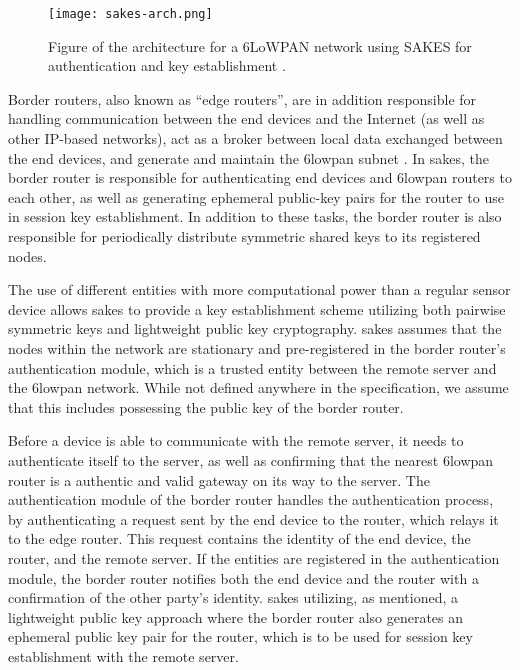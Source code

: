 \begin{figure}[h]
	\centering
	\texttt{[image: sakes-arch.png]}
	\caption{Figure of the architecture for a 6LoWPAN network using SAKES for authentication and key establishment \cite{hussen2013sakes}.}
	\label{fig:sakes-arch}
\end{figure}


Border routers, also known as ``edge routers'', are in addition responsible for handling communication between the end devices and the Internet (as well as other IP-based networks), act as a broker between local data exchanged between the end devices, and generate and maintain the \gls{6lowpan} subnet \cite{olsson20146lowpan}. In \gls{sakes}, the border router is responsible for authenticating end devices and \gls{6lowpan} routers to each other, as well as generating ephemeral public-key pairs for the router to use in session key establishment. In addition to these tasks, the border router is also responsible for periodically distribute symmetric shared keys to its registered nodes.

The use of different entities with more computational power than a regular sensor device allows \gls{sakes} to provide a key establishment scheme utilizing both pairwise symmetric keys and lightweight public key cryptography. \gls{sakes} assumes that the nodes within the network are stationary and pre-registered in the border router's authentication module, which is a trusted entity between the remote server and the \gls{6lowpan} network. While not defined anywhere in the specification, we assume that this includes possessing the public key of the border router. 

Before a device is able to communicate with the remote server, it needs to authenticate itself to the server, as well as confirming that the nearest \gls{6lowpan} router is a authentic and valid gateway on its way to the server. The authentication module of the border router handles the authentication process, by authenticating a request sent by the end device to the router, which relays it to the edge router. This request contains the identity of the end device, the router, and the remote server. If the entities are registered in the authentication module, the border router notifies both the end device and the router with a confirmation of the other party's identity. \gls{sakes} utilizing, as mentioned, a lightweight public key approach where the border router also generates an ephemeral public key pair for the router, which is to be used for session key establishment with the remote server.

